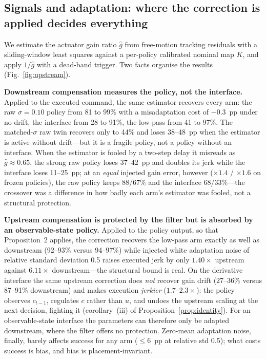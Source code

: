 \documentclass[conference]{IEEEtran}
\begin{document}
\subsection{Signals and adaptation: where the correction is applied decides everything}
\label{sec:adapt}

We estimate the actuator gain ratio $\hat g$ from free-motion tracking residuals with a sliding-window least squares against a per-policy calibrated nominal map $K$, and apply $1/\hat g$ with a dead-band trigger. Two facts organise the results (Fig.~\ref{fig:upstream}).

\textbf{Downstream compensation measures the policy, not the interface.} Applied to the executed command, the same estimator recovers every arm: the raw $\sigma=0.10$ policy from 81 to 99\% with a misadaptation cost of $-0.3$~pp under no drift, the interface from 28 to 91\%, the low-pass from 41 to 97\%. The matched-$\sigma$ raw twin recovers only to 44\% and loses 38--48~pp when the estimator is active without drift---but it is a fragile policy, not a policy without an interface. When the estimator is fooled by a two-step delay it misreads as $\hat g\approx0.65$, the strong raw policy loses 37--42~pp and doubles its jerk while the interface loses 11--25~pp; at an \emph{equal} injected gain error, however ($\times1.4$ / $\times1.6$ on frozen policies), the raw policy keeps 88/67\% and the interface 68/33\%---the crossover was a difference in how badly each arm's estimator was fooled, not a structural protection.

\textbf{Upstream compensation is protected by the filter but is absorbed by an observable-state policy.} Applied to the policy output, so that Proposition~2 applies, the correction recovers the low-pass arm exactly as well as downstream (92--93\% versus 94--97\%) while injected white adaptation noise of relative standard deviation 0.5 raises executed jerk by only $1.40\times$ upstream against $6.11\times$ downstream---the structural bound is real. On the derivative interface the same upstream correction does \emph{not} recover gain drift (27--36\% versus 87--91\% downstream) and makes execution \emph{jerkier} ($1.7$--$2.3\times$): the policy observes $c_{t-1}$, regulates $c$ rather than $u$, and undoes the upstream scaling at the next decision, fighting it (corollary~(iii) of Proposition~\ref{prop:identity}). For an observable-state interface the parameters can therefore only be adapted downstream, where the filter offers no protection. Zero-mean adaptation noise, finally, barely affects success for any arm ($\le6$~pp at relative std 0.5); what costs success is bias, and bias is placement-invariant.
\end{document}
